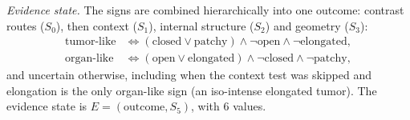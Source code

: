 \documentclass[fleqn,10pt]{olplainarticle}
\begin{document}
\emph{Evidence state.} The signs are combined hierarchically into one outcome: contrast routes ($S_0$), then context ($S_1$),
internal structure ($S_2$) and geometry ($S_3$):
\begin{equation}
\label{eq:tree}
\begin{aligned}
\text{tumor-like}&\iff(\text{closed}\vee\text{patchy})\wedge\neg\text{open}\wedge\neg\text{elongated},\\
\text{organ-like}&\iff(\text{open}\vee\text{elongated})\wedge\neg\text{closed}\wedge\neg\text{patchy},
\end{aligned}
\end{equation}
and uncertain otherwise, including when the context test was skipped and elongation is the only organ-like sign (an
iso-intense elongated tumor). The evidence state is $E=(\text{outcome},S_5)$, with $6$ values.
\end{document}
